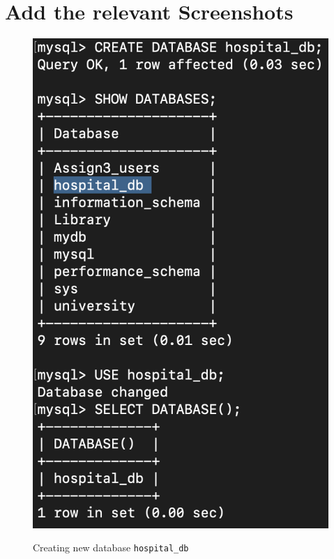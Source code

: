 \documentclass[12pt]{article}
\let\oldtexttt\texttt
\renewcommand{\texttt}[1]{
  \colorbox{bgcolor}{\oldtexttt{#1}}
  }
\begin{document}
\section{Add the relevant Screenshots}

\begin{figure}[!hbt]
    \centering
    \includegraphics[scale=0.55]{screenshots/1a.png}
    \label{fig:data}
    \caption{Creating new database \texttt{hospital\_db}}
\end{figure}
\end{document}
